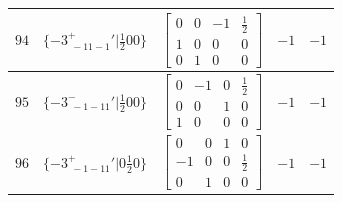 \documentclass[fleqn,8pt]{jsarticle}
\begin{document}
\begin{longtable}{ccccc}
$ 94 $ & $ \{-3^{+}_{\,\,-11-1}{}'|\frac{1}{2} 0 0\} $ & $ \begin{bmatrix} 0 & 0 & -1 & \frac{1}{2} \\ 1 & 0 & 0 & 0 \\ 0 & 1 & 0 & 0 \end{bmatrix} $ & $ -1 $ & $ -1 $ \\ \hline
$ 95 $ & $ \{-3^{-}_{\,\,-1-11}{}'|\frac{1}{2} 0 0\} $ & $ \begin{bmatrix} 0 & -1 & 0 & \frac{1}{2} \\ 0 & 0 & 1 & 0 \\ 1 & 0 & 0 & 0 \end{bmatrix} $ & $ -1 $ & $ -1 $ \\ \hline
$ 96 $ & $ \{-3^{+}_{\,\,-1-11}{}'|0 \frac{1}{2} 0\} $ & $ \begin{bmatrix} 0 & 0 & 1 & 0 \\ -1 & 0 & 0 & \frac{1}{2} \\ 0 & 1 & 0 & 0 \end{bmatrix} $ & $ -1 $ & $ -1 $ \\
\end{longtable}
\end{document}
